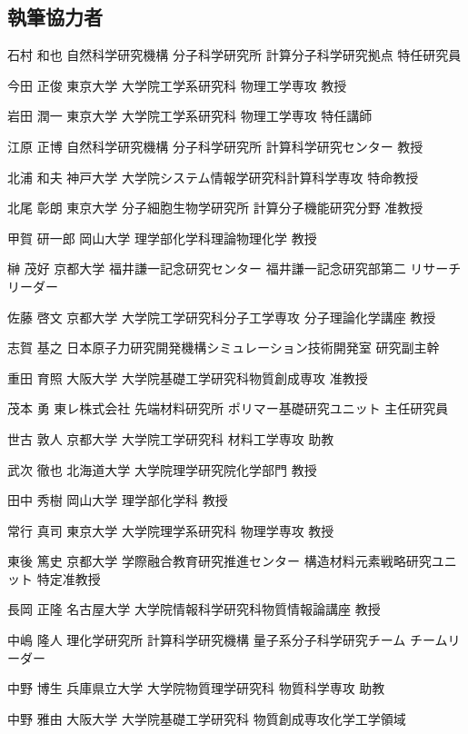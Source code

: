 \begin{執筆者一覧}
\subsection{執筆協力者}
\item
{石村 和也}
{自然科学研究機構 分子科学研究所 計算分子科学研究拠点}
{特任研究員}
\item
{今田 正俊}
{東京大学 大学院工学系研究科 物理工学専攻}
{教授}
\item
{岩田 潤一}
{東京大学 大学院工学系研究科 物理工学専攻}
{特任講師}
\item
{江原 正博}
{自然科学研究機構 分子科学研究所 計算科学研究センター}
{教授}
\item
{北浦 和夫}
{神戸大学 大学院システム情報学研究科計算科学専攻}
{特命教授}
\item
{北尾 彰朗}
{東京大学 分子細胞生物学研究所 計算分子機能研究分野}
{准教授}
\item
{甲賀 研一郎}
{岡山大学 理学部化学科理論物理化学}
{教授}
\item
{榊 茂好}
{京都大学 福井謙一記念研究センター 福井謙一記念研究部第二}
{リサーチリーダー}
\item
{佐藤 啓文}
{京都大学 大学院工学研究科分子工学専攻 分子理論化学講座}
{教授}
\item
{志賀 基之}
{日本原子力研究開発機構シミュレーション技術開発室}
{研究副主幹}
\item
{重田 育照}
{大阪大学 大学院基礎工学研究科物質創成専攻}
{准教授}
\item
{茂本 勇}
{東レ株式会社 先端材料研究所 ポリマー基礎研究ユニット}
{主任研究員}
\item
{世古 敦人}
{京都大学 大学院工学研究科 材料工学専攻}
{助教}
\item
{武次 徹也}
{北海道大学 大学院理学研究院化学部門}
{教授}
\item
{田中 秀樹}
{岡山大学 理学部化学科}
{教授}
\item
{常行 真司}
{東京大学 大学院理学系研究科 物理学専攻}
{教授}
\item
{東後 篤史}
{京都大学 学際融合教育研究推進センター 構造材料元素戦略研究ユニット}
{特定准教授}
\item
{長岡 正隆}
{名古屋大学 大学院情報科学研究科物質情報論講座}
{教授}
\item
{中嶋 隆人}
{理化学研究所 計算科学研究機構 量子系分子科学研究チーム}
{チームリーダー}
\item
{中野 博生}
{兵庫県立大学 大学院物質理学研究科 物質科学専攻}
{助教}
\item
{中野 雅由}
{大阪大学 大学院基礎工学研究科 物質創成専攻化学工学領域}

\end{執筆者一覧}
